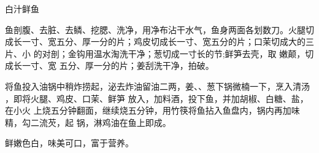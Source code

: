 \begin{recipe}{白汁鲜鱼}

\ingredients


\cooking

\step 鱼剖腹、去脏、去鳞、挖腮、洗净，用净布沾干水气，鱼身两面各划数刀。火腿切
成长一寸、宽五分、厚一分的片；鸡皮切成长一寸、宽五分的片；口茉切成大的三片、小
的对剖；金钩用温水淘洗干净；葱切成一寸长的节;鲜笋去壳，取 嫩颠，切成长一寸、宽
五分、厚一分的片；姜刮洗干净，拍破。

\step 将鱼投入油锅中稍炸捞起，泌去炸油留油二两，姜、、葱下锅微楠一下，烹入清汤
，即将火腿、鸡皮、口茉、鲜笋 放入，加料酒，投下鱼，并加胡椒、白糖、盐，在小火
上烧五分钟翻面，继续烧五分钟，用竹筷将鱼拈入鱼盘内，锅内再加味精，勾二流芡，起
锅，淋鸡油在鱼上即成。

\features

鲜嫩色白，味美可口，富于营养。

\end{recipe}


